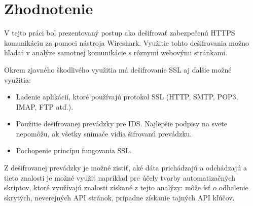 \chapter{Zhodnotenie}

V tejto práci bol prezentovaný postup ako dešifrovať zabezpečenú HTTPS komunikáciu za pomoci nástroja Wireshark. Využitie tohto dešifrovania možno hľadať v analýze samotnej komunikácie s rôznymi webovými stránkami.

Okrem zjavného škodlivého využitia má dešifrovanie SSL aj ďalšie možné využitia:

\begin{itemize}
	\item Ladenie aplikácií, ktoré používajú protokol SSL (HTTP, SMTP, POP3, IMAP, FTP atď.).
	\item Použitie dešifrovanej prevádzky pre IDS. Najlepšie podpisy na svete nepomôžu, ak všetky snímače vidia šifrovanú prevádzku.
	\item Pochopenie princípu fungovania SSL.
\end{itemize}

Z dešifrovanej prevádzky je možné zistiť, aké dáta prichádzajú a odchádzajú a tieto znalosti je možné využiť napríklad pre účely tvorby automatizačných skriptov, ktoré využívajú znalosti získané z tejto analýzy: môže ísť o odhalenie skrytých, neverejných API stránok, prípadne získanie tajných API kľúčov.